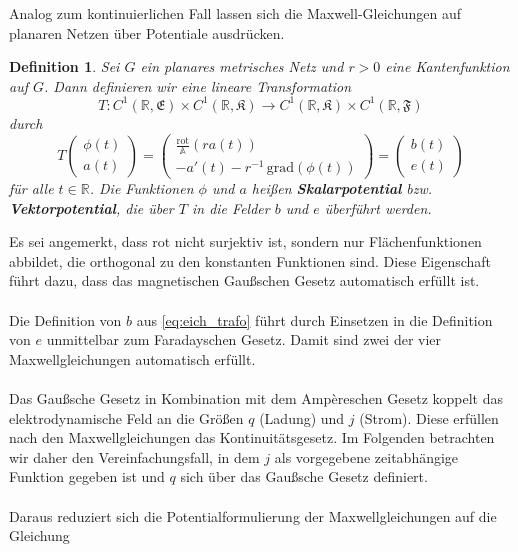 \documentclass[11pt,a4paper,leqno]{report}
\newtheorem{definition}[theorem]{Definition}
\numberwithin{equation}{chapter}
\begin{document}
Analog zum kontinuierlichen Fall lassen sich die Maxwell-Gleichungen auf planaren Netzen über Potentiale ausdrücken.  
\begin{definition} \label{def:potential_def}
	Sei \(G\) ein planares metrisches Netz und \(r > 0\) eine Kantenfunktion auf \(G\).  
	Dann definieren wir eine lineare Transformation 
	\[
	T : C^1(\mathbb{R}, \mathfrak{E}) \times C^1(\mathbb{R}, \mathfrak{K}) \to C^1(\mathbb{R}, \mathfrak{K}) \times C^1(\mathbb{R}, \mathfrak{F})
	\]
	durch
	\begin{equation}
		T \begin{pmatrix} \phi(t) \\ a(t) \end{pmatrix}
		= \begin{pmatrix}
			\frac{\mathrm{rot}}{\mathbb{A}}(r a(t))  \\
			- a'(t) - r^{-1}\, \mathrm{grad}(\phi(t))
		\end{pmatrix}= \begin{pmatrix} b(t) \\ e(t) \end{pmatrix}\label{eq:eich_trafo}
	\end{equation}
	für alle \(t \in \mathbb{R}\). Die Funktionen \(\phi\) und \(a\) heißen \textbf{Skalarpotential} bzw. \textbf{Vektorpotential}, die über \(T\) in die Felder \(b\) und \(e\) überführt werden.
\end{definition}
\noindent
Es sei angemerkt, dass \(\mathrm{rot}\) nicht surjektiv ist, sondern nur Flächenfunktionen abbildet, die orthogonal zu den konstanten Funktionen sind. Diese Eigenschaft führt dazu, dass das magnetischen Gaußschen Gesetz automatisch erfüllt ist.  \\
\\
Die Definition von \(b\) aus \eqref{eq:eich_trafo} führt durch Einsetzen in die Definition von \(e\) unmittelbar zum Faradayschen Gesetz. Damit sind zwei der vier Maxwellgleichungen automatisch erfüllt.  
\\
\\
Das Gaußsche Gesetz in Kombination mit dem Ampèreschen Gesetz koppelt das elektrodynamische Feld an die Größen \(q\) (Ladung) und \(j\) (Strom). Diese erfüllen nach den Maxwellgleichungen das Kontinuitätsgesetz. Im Folgenden betrachten wir daher den Vereinfachungsfall, in dem \(j\) als vorgegebene zeitabhängige Funktion gegeben ist und \(q\) sich über das Gaußsche Gesetz definiert.  \\
\\
Daraus reduziert sich die Potentialformulierung der Maxwellgleichungen auf die Gleichung  
\end{document}
